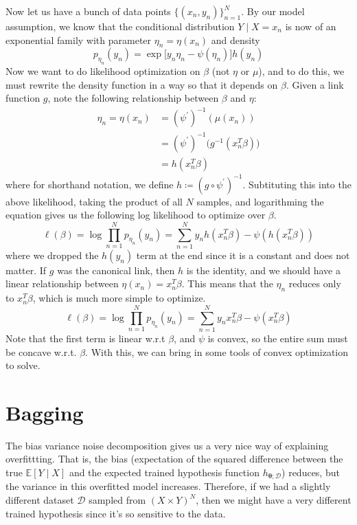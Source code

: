 \documentclass{article}
\begin{document}
    Now let us have a bunch of data points $\{(x_n, y_n)\}_{n=1}^N$. By our model assumption, we know that the conditional distribution $Y \mid X = x_n$ is now of an exponential family with parameter $\eta_n = \eta (x_n)$ and density 
    \[p_{\eta_n} (y_n) = \exp \big[ y_n \eta_n - \psi(\eta_n) \big] h(y_n)\]
    Now we want to do likelihood optimization on $\beta$ (not $\eta$ or $\mu$), and to do this, we must rewrite the density function in a way so that it depends on $\beta$. Given a link function $g$, note the following relationship between $\beta$ and $\eta$: 
    \begin{align*}
        \eta_n = \eta (x_n) & = (\psi^\prime)^{-1} (\mu (x_n)) \\
        & = (\psi^{\prime})^{-1} \big( g^{-1} (x_n^T \beta )\big) \\
        & = h(x_n^T \beta) 
    \end{align*}
    where for shorthand notation, we define $h \coloneqq (g \circ \psi^\prime)^{-1}$. Subtituting this into the above likelihood, taking the product of all $N$ samples, and logarithming the equation gives us the following log likelihood to optimize over $\beta$. 
    \[\ell(\beta) = \log \prod_{n=1}^N p_{\eta_n} (y_n) = \sum_{n=1}^N y_n h(x_n^T \beta)  - \psi(h(x_n^T \beta) )\]
    where we dropped the $h(y_n)$ term at the end since it is a constant and does not matter. If $g$ was the canonical link, then $h$ is the identity, and we should have a linear relationship between $\eta (x_n) = x_n^T \beta$. This means that the $\eta_n$ reduces only to $x_n^T \beta$, which is much more simple to optimize. 
    \[\ell(\beta) = \log \prod_{n=1}^N p_{\eta_n} (y_n) = \sum_{n=1}^N y_n x_n^T \beta - \psi(x_n^T \beta)\]
    Note that the first term is linear w.r.t $\beta$, and $\psi$ is convex, so the entire sum must be concave w.r.t. $\beta$. With this, we can bring in some tools of convex optimization to solve. 

\section{Bagging}

  The bias variance noise decomposition gives us a very nice way of explaining overfittting. That is, the bias (expectation of the squared difference between the true $\mathbb{E}[Y \mid X]$ and the expected trained hypothesis function $h_{\boldsymbol{\theta}; \mathcal{D}}$) reduces, but the variance in this overfitted model increases. Therefore, if we had a slightly different dataset $\mathcal{D}$ sampled from $(X \times Y)^N$, then we might have a very different trained hypothesis since it's so sensitive to the data. 
\end{document}
